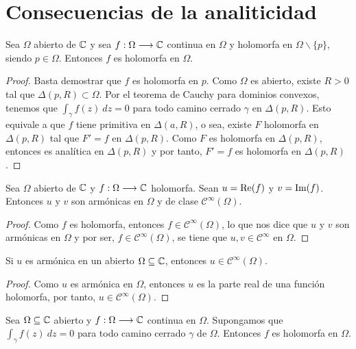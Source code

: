 \section{Consecuencias de la analiticidad}

\begin{teo}
    Sea $\Omega$ abierto de $\mathbb{C}$ y sea $f: \Omega \longrightarrow \mathbb{C}$ continua en $\Omega$ y holomorfa en $\Omega \backslash \{p\}$, siendo $p \in \Omega$. Entonces $f$ es holomorfa en $\Omega$.
\end{teo}

\begin{proof}
    Basta demostrar que $f$ es holomorfa en $p$. Como $\Omega$ es abierto, existe $R > 0$ tal que $\Delta(p,R) \subset \Omega$. Por el teorema de Cauchy para dominios convexos, tenemos que $\int_{\gamma}{f(z) \ dz} = 0$ para todo camino cerrado $\gamma$ en $\Delta(p,R)$. Esto equivale a que $f$ tiene primitiva en $\Delta(a,R)$, o sea, existe $F$ holomorfa en $\Delta(p,R)$ tal que $F' = f$ en $\Delta(p,R)$. Como $F$ es holomorfa en $\Delta(p,R)$, entonces es analítica en $\Delta(p,R)$ y por tanto, $F' = f$ es holomorfa en $\Delta(p,R)$.
\end{proof}

\begin{teo}
    Sea $\Omega$ abierto de $\mathbb{C}$ y $f: \Omega \longrightarrow \mathbb{C}$ holomorfa. Sean $u = \text{Re}(f)$ y $v = \text{Im}(f)$. Entonces $u$ y $v$ son armónicas en $\Omega$ y de clase $\mathcal{C}^{\infty}(\Omega)$.
\end{teo}

\begin{proof}
    Como $f$ es holomorfa, entonces $f \in \mathcal{C}^{\infty}(\Omega)$, lo que nos dice que $u$ y $v$ son armónicas en $\Omega$ y por ser, $f \in \mathcal{C}^{\infty}(\Omega)$, se tiene que $u,v \in \mathcal{C}^{\infty}$ en $\Omega$.
\end{proof}

\begin{cor}
    Si $u$ es armónica en un abierto $\Omega \subseteq \mathbb{C}$, entonces $u \in \mathcal{C}^{\infty}(\Omega)$.
\end{cor}

\begin{proof}
    Como $u$ es armónica en $\Omega$, entonces $u$ es la parte real de una función holomorfa, por tanto, $u \in \mathcal{C}^{\infty}(\Omega)$.
\end{proof}

\begin{teo}[de Morera]
    Sea $\Omega \subseteq \mathbb{C}$ abierto y $f: \Omega \longrightarrow \mathbb{C}$ continua en $\Omega$. Supongamos que $\int_{\gamma}{f(z) \ dz} = 0$ para todo camino cerrado $\gamma$ de $\Omega$. Entonces $f$ es holomorfa en $\Omega$.
\end{teo}

